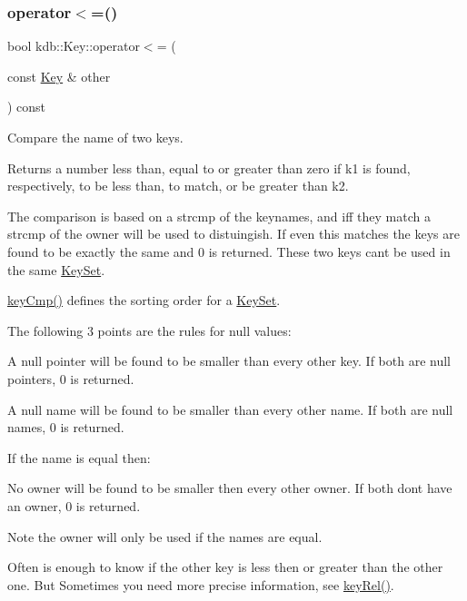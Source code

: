 \subsubsection{\texorpdfstring{operator$<$=()}{operator<=()}}
{\footnotesize\ttfamily bool kdb\+::\+Key\+::operator$<$= (\begin{DoxyParamCaption}\item[{const \hyperlink{classkdb_1_1Key}{Key} \&}]{other }\end{DoxyParamCaption}) const\hspace{0.3cm}{\ttfamily [inline]}}



Compare the name of two keys. 

\begin{DoxyReturn}{Returns}
a number less than, equal to or greater than zero if k1 is found, respectively, to be less than, to match, or be greater than k2.
\end{DoxyReturn}
The comparison is based on a strcmp of the keynames, and iff they match a strcmp of the owner will be used to distuingish. If even this matches the keys are found to be exactly the same and 0 is returned. These two keys can\textquotesingle{}t be used in the same \hyperlink{classkdb_1_1KeySet}{Key\+Set}.

\hyperlink{group__keytest_gaf6e66e12fe04d535a5d1c8218ced803e}{key\+Cmp()} defines the sorting order for a \hyperlink{classkdb_1_1KeySet}{Key\+Set}.

The following 3 points are the rules for null values\+:


\begin{DoxyItemize}
\item A null pointer will be found to be smaller than every other key. If both are null pointers, 0 is returned.
\item A null name will be found to be smaller than every other name. If both are null names, 0 is returned.
\end{DoxyItemize}

If the name is equal then\+:


\begin{DoxyItemize}
\item No owner will be found to be smaller then every other owner. If both don\textquotesingle{}t have an owner, 0 is returned.
\end{DoxyItemize}

\begin{DoxyNote}{Note}
the owner will only be used if the names are equal.
\end{DoxyNote}
Often is enough to know if the other key is less then or greater than the other one. But Sometimes you need more precise information, see \hyperlink{group__keytest_ga6bb0f95ac34ce9c42d61bb35a76139d0}{key\+Rel()}.

